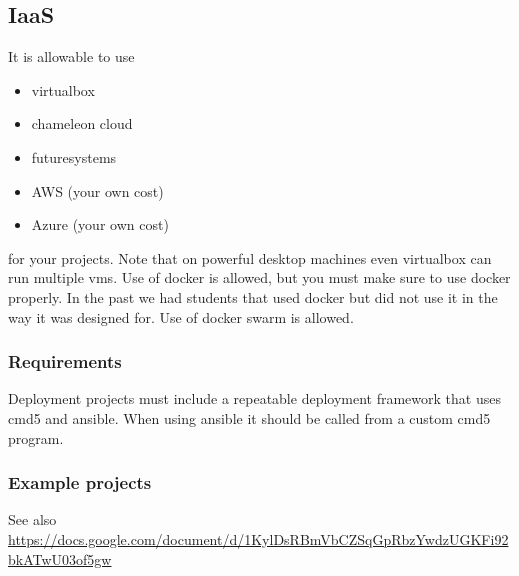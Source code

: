 \subsection{IaaS}\label{iaas}

It is allowable to use

\begin{itemize}

\item
  virtualbox
\item
  chameleon cloud
\item
  futuresystems
\item
  AWS (your own cost)
\item
  Azure (your own cost)
\end{itemize}

for your projects. Note that on powerful desktop machines even
virtualbox can run multiple vms. Use of docker is allowed, but you must
make sure to use docker properly. In the past we had students that used
docker but did not use it in the way it was designed for. Use of docker
swarm is allowed.

\subsubsection{Requirements}\label{requirements}

Deployment projects must include a repeatable deployment framework that
uses cmd5 and ansible. When using ansible it should be called from a
custom cmd5 program.

\subsubsection{Example projects}\label{example-projects}

See also
\url{https://docs.google.com/document/d/1KylDsRBmVbCZSqGpRbzYwdzUGKFi92bkATwU03of5gw}

